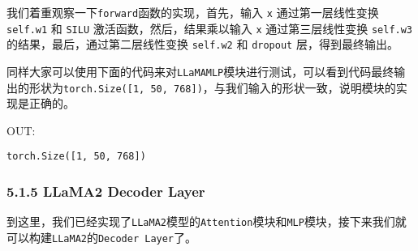 \documentclass[12pt,a4paper]{book}
\begin{document}
我们着重观察一下\texttt{forward}函数的实现，首先，输入 \texttt{x}
通过第一层线性变换 \texttt{self.w1} 和 \texttt{SILU}
激活函数，然后，结果乘以输入 \texttt{x} 通过第三层线性变换
\texttt{self.w3} 的结果，最后，通过第二层线性变换 \texttt{self.w2} 和
\texttt{dropout} 层，得到最终输出。

同样大家可以使用下面的代码来对\texttt{LLaMAMLP}模块进行测试，可以看到代码最终输出的形状为\texttt{torch.Size({[}1,\ 50,\ 768{]})}，与我们输入的形状一致，说明模块的实现是正确的。

\begin{Shaded}
\begin{Highlighting}[]
\OperatorTok{=}
\OperatorTok{=}\NormalTok{, }
\OperatorTok{=}
\end{Highlighting}
\end{Shaded}

OUT:

\begin{verbatim}
torch.Size([1, 50, 768])
\end{verbatim}

\subsubsection{5.1.5 LLaMA2 Decoder Layer}\label{llama2-decoder-layer}

到这里，我们已经实现了\texttt{LLaMA2}模型的\texttt{Attention}模块和\texttt{MLP}模块，接下来我们就可以构建\texttt{LLaMA2}的\texttt{Decoder\ Layer}了。
\end{document}
